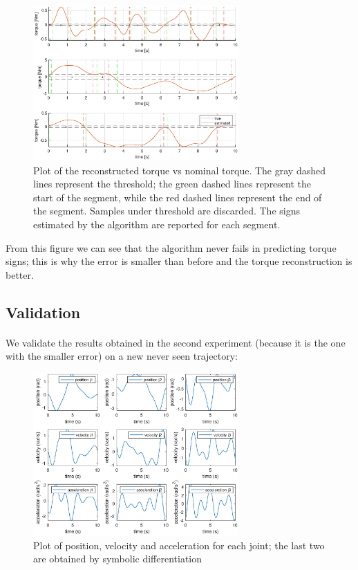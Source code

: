\documentclass{article}
\begin{document}
\begin{figure}[!htbp]
\centering
\includegraphics[width=0.7\textwidth]{images/3-dof/results2.eps}
\caption{Plot of the reconstructed torque vs nominal torque. The gray dashed lines represent the threshold; the green dashed lines represent the start of the segment, while the red dashed lines represent the end of the segment. Samples under threshold are discarded. The signs estimated by the algorithm are reported for each segment.}
\end{figure}
\FloatBarrier

From this figure we can see that the algorithm never fails in predicting torque signs; this is why the error is smaller than before and the torque reconstruction is better.

\subsection{Validation} \paragraph{} We validate the results obtained in the second experiment (because it is the one with the smaller error) on a new never seen trajectory:

\begin{figure}[!htbp]
\centering
\includegraphics[width=0.7\textwidth]{images/3-dof/validation_trajectory.eps}
\caption{Plot of position, velocity and acceleration for each joint; the last two are obtained by symbolic differentiation}
\end{figure}
\FloatBarrier
\end{document}
